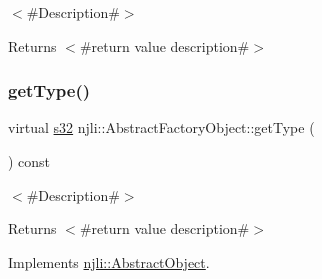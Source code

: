 $<$\#\+Description\#$>$

\begin{DoxyReturn}{Returns}
$<$\#return value description\#$>$ 
\end{DoxyReturn}
\mbox{\label{classnjli_1_1_abstract_factory_object_a207c86146d40d0794708ae7f2d4e60a7}} 
\subsubsection{\texorpdfstring{get\+Type()}{getType()}}
{\footnotesize\ttfamily virtual \mbox{\hyperlink{_util_8h_aa62c75d314a0d1f37f79c4b73b2292e2}{s32}} njli\+::\+Abstract\+Factory\+Object\+::get\+Type (\begin{DoxyParamCaption}{ }\end{DoxyParamCaption}) const\hspace{0.3cm}{\ttfamily [pure virtual]}}

$<$\#\+Description\#$>$

\begin{DoxyReturn}{Returns}
$<$\#return value description\#$>$ 
\end{DoxyReturn}


Implements \mbox{\hyperlink{classnjli_1_1_abstract_object_a08dcf202a47f0782813b8bc98c659e78}{njli\+::\+Abstract\+Object}}.



